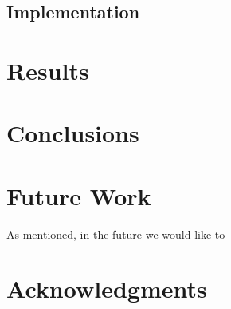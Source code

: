 \documentclass{sig-alternate}
\begin{document}
\subsection{Implementation}

\section{Results}

\section{Conclusions}
\cite{ole:feedback}

\section{Future Work}
As mentioned, in the future we would like to 

\section{Acknowledgments}



\end{document}
